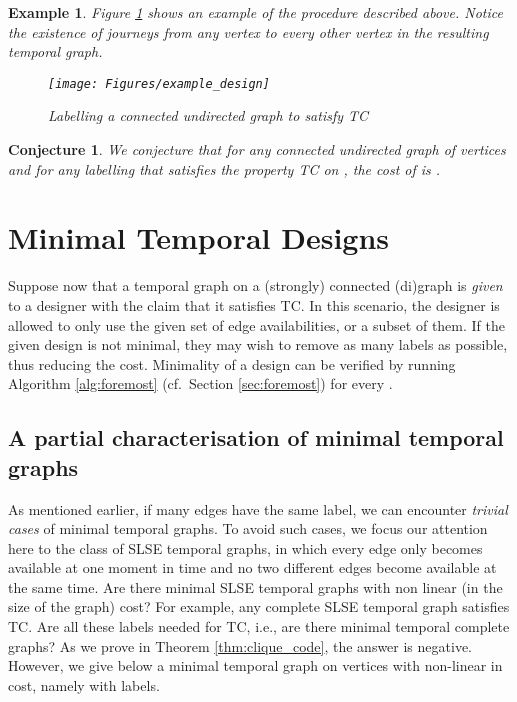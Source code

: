 \documentclass[a4paper,UKenglish]{article}
\newtheorem*{conjecture*}{Conjecture}
\newtheorem*{example*}{Example}
\begin{document}
\begin{example*} Figure \ref{fig:example} shows an example of the procedure described above. Notice the existence of journeys from any vertex to every other vertex in the resulting temporal graph.
\begin{figure}[!htb]
\centering
\texttt{[image: Figures/example\_design]}
\caption{Labelling a connected undirected graph to satisfy TC}
\label{fig:example}
\end{figure}
\end{example*}

\begin{conjecture*}
We conjecture that for any connected undirected graph  of  vertices and for any labelling  that satisfies the property TC on , the cost of  is .
\end{conjecture*}


























\section{Minimal Temporal Designs}\label{sec:minimal}
Suppose now that a temporal graph on a (strongly) connected (di)graph  is \emph{given} to a designer with the claim that it satisfies TC. In this scenario, the designer is allowed to only use the given set of edge availabilities, or a subset of them. If the given design is not minimal, they may wish to remove as many labels as possible, thus reducing the cost. Minimality of a design can be verified by running Algorithm \ref{alg:foremost} (cf.~Section \ref{sec:foremost}) for every .



\subsection{A partial characterisation of minimal temporal graphs}\label{sec:full_paper_hyper}
As mentioned earlier, if many edges have the same label, we can encounter \emph{trivial cases} of minimal temporal graphs. To avoid such cases, we focus our attention here to the class of SLSE temporal graphs, in which every edge only becomes available at one moment in time and no two different edges become available at the same time. Are there minimal SLSE temporal graphs with non linear (in the size of the graph) cost? For example, any complete SLSE temporal graph satisfies TC. Are all these  labels needed for TC, i.e., are there minimal temporal complete graphs? As we prove in Theorem \ref{thm:clique_code}, the answer is negative. However, we give below a minimal temporal graph on  vertices with non-linear in  cost, namely with  labels.
\end{document}
